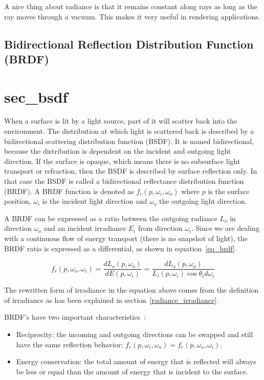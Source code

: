 \documentclass[11pt,a4paper]{report}
\begin{document}
A nice thing about radiance is that it remains constant along rays as long as the ray moves through a vacuum. This makes it very useful in rendering applications.

\subsection{Bidirectional Reflection Distribution Function (BRDF)}
\section{sec_bsdf}

When a surface is lit by a light source, part of it will scatter back into the environment. The distribution at which light is scattered back is described by a bidirectional scattering distribution function (BSDF). It is named bidirectional, because the distribution is dependent on the incident and outgoing light direction. If the surface is opaque, which means there is no subsurface light transport or refraction, then the BSDF is described by surface reflection only. In that case the BSDF is called a bidirectional reflectance distribution function (BRDF). A BRDF function is denoted as $f_r(p, \omega_i, \omega_o)$ where $p$ is the surface position, $\omega_i$ is the incident light direction and $\omega_o$ the outgoing light direction.

A BRDF can be expressed as a ratio between the outgoing radiance $L_o$ in direction $\omega_o$ and an incident irradiance $E_i$ from direction $\omega_i$. Since we are dealing with a continuous flow of energy transport (there is no snapshot of light), the BRDF ratio is expressed as a differential, as shown in equation~\ref{eq_brdf}.

\begin{equation}
f_r(p, \omega_o, \omega_i) = \frac{dL_o(p, \omega_o)}{dE(p,\omega_i)} = \frac{dL_o(p, \omega_o)}{L_i(p, \omega_i) \cos \theta_i d\omega_i}
\label{eq_brdf}
\end{equation}

The rewritten form of irradiance in the equation above comes from the definition of irradiance as has been explained in section~\ref{radiance_irradiance}.

BRDF's have two important characteristics~\cite{pharr2017}:

\begin{itemize}
\item Reciprocity: the incoming and outgoing directions can be swapped and still have the same reflection behavior: $f_r(p, \omega_i, \omega_o) = f_r(p, \omega_o, \omega_i)$.
\item Energy conservation: the total amount of energy that is reflected will always be less or equal than the amount of energy that is incident to the surface.
\end{itemize}
\end{document}
